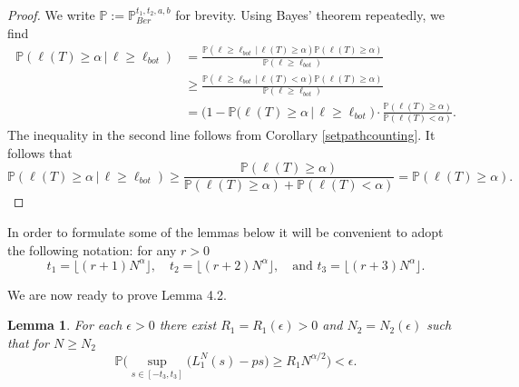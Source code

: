 \documentclass[12pt]{article}
\newtheorem{lemma}{Lemma}
\begin{document}
	\begin{proof}
		We write $\mathbb{P} := \mathbb{P}^{t_1,t_2,a,b}_{Ber}$ for brevity. Using Bayes' theorem repeatedly, we find
		\begin{align*}
		\mathbb{P}(\ell(T)\geq\alpha\,|\,\ell \geq \ell_{bot}) &= \frac{\mathbb{P}(\ell \geq \ell_{bot}\,|\,\ell(T)\geq\alpha) \mathbb{P}(\ell(T)\geq\alpha)}{\mathbb{P}(\ell \geq \ell_{bot})}\\ 
		&\geq \frac{\mathbb{P}(\ell \geq \ell_{bot}\,|\,\ell(T) < \alpha) \mathbb{P}(\ell(T)\geq\alpha)}{\mathbb{P}(\ell \geq \ell_{bot})}\\
		&= \big(1 - \mathbb{P}(\ell(T)\geq\alpha\,|\,\ell \geq \ell_{bot}\big)\cdot\frac{\mathbb{P}(\ell(T)\geq\alpha)}{\mathbb{P}(\ell(T) < \alpha)}.
		\end{align*}
		The inequality in the second line follows from Corollary \ref{setpathcounting}. It follows that
		\[
		\mathbb{P}(\ell(T)\geq\alpha\,|\,\ell \geq \ell_{bot}) \geq \frac{\mathbb{P}(\ell(T)\geq\alpha)}{\mathbb{P}(\ell(T)\geq\alpha) + \mathbb{P}(\ell(T) < \alpha)} = \mathbb{P}(\ell(T)\geq\alpha).
		\]
	\end{proof}

	In order to formulate some of the lemmas below it will be convenient to adopt the following notation: for any $r > 0$
	\begin{equation*}\label{eqsts}
	t_1 =\lfloor (r+1) N^{\alpha} \rfloor,\quad t_2 = \lfloor (r+2)N^{\alpha} \rfloor,\quad \textrm{and } t_3 = \lfloor (r+3)N^{\alpha} \rfloor.
	\end{equation*}
	
	We are now ready to prove Lemma 4.2.

	\begin{lemma}
		For each $\epsilon > 0$ there exist $R_1=R_1(\epsilon) > 0$ and $N_2= N_2(\epsilon)$ such that for $N \geq N_2$ 
		$$\mathbb{P}\Big( \sup_{s \in [ -t_3, t_3] }\big( L^N_1(s) - p s \big) \geq  R_1N^{\alpha/2} \Big) < \epsilon.$$
	\end{lemma}
\end{document}
